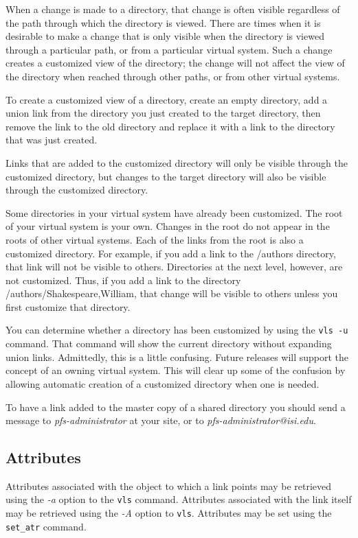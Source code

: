 When a change is made to a directory, that change is often
visible regardless of the path through which the directory is viewed.
There are times when it is desirable to make a change that is only
visible when the directory is viewed through a particular path, or
from a particular virtual system.  Such a change creates a customized
view of the directory; the change will not affect the view of the
directory when reached through other paths, or from other virtual
systems.

To create a customized view of a directory, create an empty directory,
add a union link from the directory you just created to the target
directory, then remove the link to the old directory and replace it
with a link to the directory that was just created.

Links that are added to the customized directory will only be visible
through the customized directory, but changes to the target directory
will also be visible through the customized directory.

Some directories in your virtual system have already been customized.
The root of your virtual system is your own.  Changes in the root do
not appear in the roots of other virtual systems.  Each of the links
from the root is also a customized directory.  For example, if you add
a link to the /authors directory, that link will not be visible to
others.  Directories at the next level, however, are not customized.
Thus, if you add a link to the directory /authors/Shakespeare,William,
that change will be visible to others unless you first customize that
directory.

You can determine whether a directory has been customized by using the
{\tt vls -u} command.  That command will show the current directory
without expanding union links.  Admittedly, this is a little
confusing.  Future releases will support the concept of an owning
virtual system.  This will clear up some of the confusion by allowing
automatic creation of a customized directory when one is needed.

To have a link added to the master copy of a shared directory you
should send a message to {\it pfs-administrator} at your site, or to
{\it pfs-administrator@isi.edu}.

\subsection{Attributes}

Attributes associated with the object to which a link points may be
retrieved using the {\it -a} option to the {\tt vls} command.
Attributes associated with the link itself may be retrieved
using the {\it -A} option to {\tt vls}.  Attributes may be set using
the {\tt set\_atr} command.

